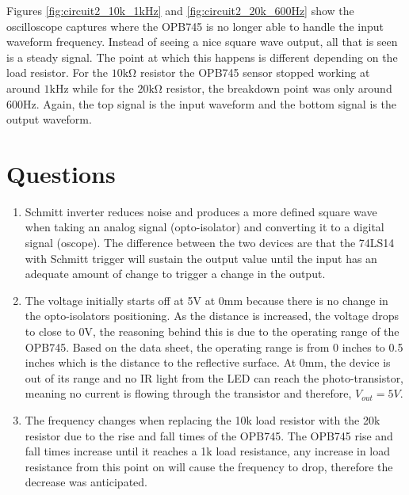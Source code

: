 \documentclass[CMPE]{KGCOEReport}
\begin{document}

Figures \ref{fig:circuit2_10k_1kHz} and \ref{fig:circuit2_20k_600Hz} show the oscilloscope captures where the 
OPB745 is no longer able to handle the input waveform frequency. Instead of seeing a nice square wave output, 
all that is seen is a steady signal. The point at which this happens is different depending on the load resistor.
For the $10\si{\kilo\ohm}$ resistor the OPB745 sensor stopped working at around $1\si{\kilo\hertz}$ while for the
$20\si{\kilo\ohm}$ resistor, the breakdown point was only around $600\si\hertz$. Again, the top signal is the input
waveform and the bottom signal is the output waveform.


\section{Questions}
\begin{enumerate}
	\item Schmitt inverter reduces noise and produces a more defined square wave when taking an analog signal (opto-isolator) and converting it to a digital signal (oscope). The difference between the two devices are that the 74LS14 with Schmitt trigger will sustain the output value until the input has an adequate amount of change to trigger a change in the output.
	\item The voltage initially starts off at 5V at 0mm because there is no change in the opto-isolators positioning. As the distance is increased, the voltage drops to close to 0V, the reasoning behind this is due to the operating range of the OPB745. Based on the data sheet, the operating range is from 0 inches to 0.5 inches which is the distance to the reflective surface. At 0mm, the device is out of its range and no IR light from the LED can reach the photo-transistor, meaning no current is flowing through the transistor and therefore, $V_{out} = 5V$.
	\item The frequency changes when replacing the 10k load resistor with the 20k resistor due to the rise and fall times of the OPB745. The OPB745 rise and fall times increase until it reaches a 1k load resistance, any increase in load resistance from this point on will cause the frequency to drop, therefore the decrease was anticipated. 
\end{enumerate}
\end{document}
